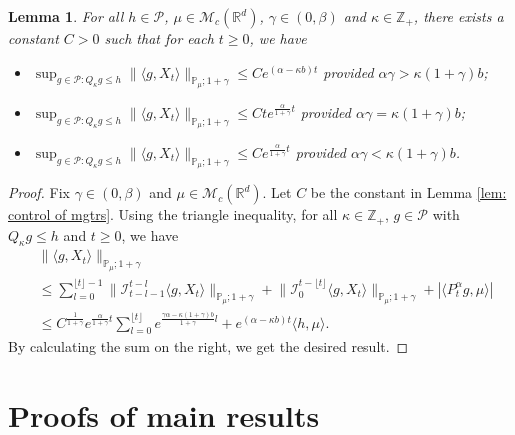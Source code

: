 \documentclass[12pt,a4paper]{amsart}
\theoremstyle{plain}
\newtheorem{lem}[thm]{Lemma}
\theoremstyle{definition}
\numberwithin{equation}{section}
\begin{document}
\begin{lem}
\label{lem: control moment}
    For all $h \in \mathcal P$, $\mu \in \mathcal M_c(\mathbb R^d)$, $\gamma\in (0, \beta)$ and $\kappa \in \mathbb Z_+$, there exists a constant $C > 0$ such that for each $t\geq 0$, we have
\begin{itemize}
\item[(1)]
    $\sup_{g\in \mathcal P: Q_\kappa g \leq h}\|\langle g,X_t\rangle\|_{\mathbb{P}_{\mu};1+\gamma}\leq C e^{(\alpha-\kappa b)t}$ provided $\alpha\gamma > \kappa (1+\gamma)b$;
\item[(2)]
    $\sup_{g\in \mathcal P: Q_\kappa g \leq h}\|\langle g,X_t\rangle\|_{\mathbb{P}_{\mu};1+\gamma}\leq C te^{\frac{\alpha}{1+\gamma}t}$ provided $\alpha\gamma = \kappa (1+\gamma)b$;
\item[(3)]
    $\sup_{g\in \mathcal P: Q_\kappa g \leq h} \|\langle g,X_t\rangle\|_{\mathbb{P}_{\mu};1+\gamma}\leq C e^{\frac{\alpha}{1+\gamma}t}$ provided $\alpha\gamma < \kappa (1+\gamma)b$.
\end{itemize}
\end{lem}
\begin{proof}
    Fix $\gamma \in (0,\beta)$ and $\mu \in \mathcal M_c(\mathbb R^d)$.
    Let $C$ be the constant in Lemma \ref{lem: control of mgtrs}.
    Using the triangle inequality, for all $\kappa\in \mathbb Z_+$, $g \in \mathcal P$ with $Q_\kappa g \leq h$ and $t\geq 0$, we have
\begin{equation}\begin{split}
    &\|\langle g,X_t\rangle\|_{\mathbb P_\mu;1+\gamma}
        \\ &\leq \sum_{l=0}^{\lfloor t\rfloor - 1}\big\| \mathcal{I}_{t-l-1}^{t-l}\langle g,X_t\rangle \big\|_{\mathbb P_\mu;1+\gamma}+\big\| \mathcal{I}_{0}^{t-\lfloor t \rfloor}\langle g,X_t\rangle  \big\|_{\mathbb P_\mu;1+\gamma}
    + |\langle P^\alpha_t g,\mu\rangle|
    \\ &\leq C^{\frac{1}{1+\gamma}} e^{\frac{\alpha}{1+\gamma}t} \sum_{l=0}^{\lfloor t\rfloor} e^{\frac{\gamma\alpha-\kappa (1+\gamma)b}{1+\gamma} l} + e^{(\alpha - \kappa b)t} \langle h,\mu\rangle.
\end{split}\end{equation}
    By calculating the sum on the right, we get the desired result.
\end{proof}

\section{Proofs of main results}
\end{document}
